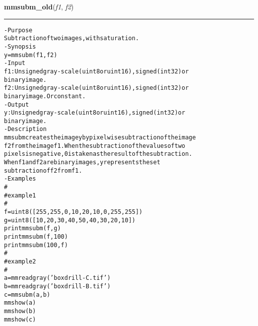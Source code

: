     \begin{boxedminipage}{\textwidth}

    \raggedright \textbf{mmsubm\_old}(\textit{f1}, \textit{f2})

    \vspace{-1.5ex}

    \rule{\textwidth}{0.5\fboxrule}
\begin{alltt}
- Purpose
    Subtraction of two images, with saturation.
- Synopsis
    y = mmsubm(f1, f2)
- Input
    f1: Unsigned gray-scale (uint8 or uint16), signed (int32) or
        binary image.
    f2: Unsigned gray-scale (uint8 or uint16), signed (int32) or
        binary image. Or constant.
- Output
    y: Unsigned gray-scale (uint8 or uint16), signed (int32) or
       binary image.
- Description
    mmsubm creates the image y by pixelwise subtraction of the image
    f2 from the image f1 . When the subtraction of the values of two
    pixels is negative, 0 is taken as the result of the subtraction.
    When f1 and f2 are binary images, y represents the set
    subtraction of f2 from f1 .
- Examples
    \#
    \#   example 1
    \#
    f = uint8([255,   255,    0,   10,   20,   10,    0,   255,  255])
    g = uint8([10,     20,   30,   40,   50,   40,   30,    20,    10])
    print mmsubm(f, g)
    print mmsubm(f, 100)
    print mmsubm(100, f)
    \#
    \#   example 2
    \#
    a = mmreadgray('boxdrill-C.tif')
    b = mmreadgray('boxdrill-B.tif')
    c = mmsubm(a,b)
    mmshow(a)
    mmshow(b)
    mmshow(c)\end{alltt}

    \vspace{1ex}

    \end{boxedminipage}

    \label{multireg:num_pymorph:mmsupcanon}
    \vspace{0.5ex}

